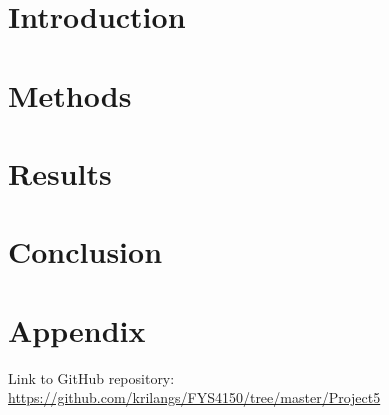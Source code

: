 \documentclass[12pt,a4paper,english]{article}
\begin{document}
\section{Introduction}
\label{sect:Introduction}
\section{Methods}
\label{sect:Method}
\section{Results}
\label{sect:Results}
\section{Conclusion}
\label{sect:Conclusion}

\appendix
\section{Appendix}
\label{sect:appendix}
Link to GitHub repository:\\
\url{https://github.com/krilangs/FYS4150/tree/master/Project5}



\end{document}
